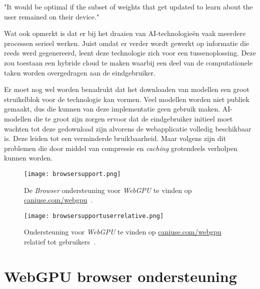 \begin{displayquote}
    "It would be optimal if the subset of weights that get updated to learn about the user remained on their device."
\end{displayquote}

Wat \textcite{Fleetwood2022} ook opmerkt is dat er bij het draaien van  AI-technologieën vaak meerdere processen serieel werken. Juist omdat er verder wordt gewerkt op informatie die reeds werd gegenereerd, leent deze technologie zich voor een tussenoplossing. Deze zou toestaan een hybride cloud te maken waarbij een deel van de computationele taken worden overgedragen aan de eindgebruiker.

\bigbreak{}

Er moet nog wel worden benadrukt dat het downloaden van modellen een groot struikelblok voor de technologie kan vormen. Veel modellen worden niet publiek gemaakt, dus die kunnen van deze implementatie geen gebruik maken. AI-modellen die te groot zijn zorgen ervoor dat de eindgebruiker initieel moet wachten tot deze gedownload zijn alvorens de webapplicatie volledig beschikbaar is. Deze leiden tot een verminderde bruikbaarheid. Maar volgens \textcite{Fleetwood2022} zijn dit problemen die door middel van compressie en \textit{caching} grotendeels verholpen kunnen worden.

\break{}

\begin{figure}
    \texttt{[image: browsersupport.png]}
    \caption[Ondersteuning voor \textit{WebGPU}~\autocite{Deveria2024}]{
        De \textit{Browser} ondersteuning voor \textit{WebGPU} te vinden op \href{https://caniuse.com/webgpu}{caniuse.com/webgpu}~\autocite{Deveria2024}.
    }
    \label{fig:Browser Support}
\end{figure}

\begin{figure}
    \texttt{[image: browsersupportuserrelative.png]}
    \caption[\textit{Browser} gebruiker toegang tot \textit{WebGPU}~\autocite{Deveria2024}]{
        Ondersteuning voor \textit{WebGPU} te vinden op \href{https://caniuse.com/webgpu}{caniuse.com/webgpu} relatief tot gebruikers~\autocite{Deveria2024}.
    }
    \label{fig:Relative Browser Support}
\end{figure}

\section{WebGPU browser ondersteuning}

